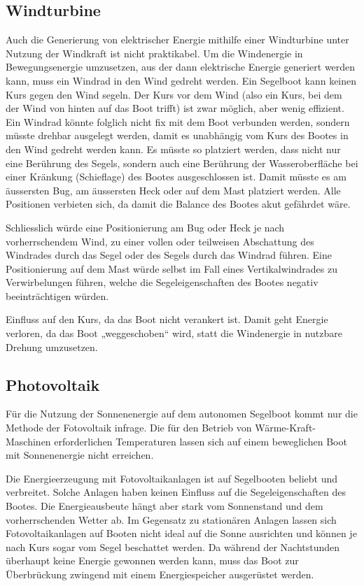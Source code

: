 \subsection{Windturbine}
Auch die Generierung von elektrischer Energie mithilfe einer Windturbine unter Nutzung der Windkraft ist nicht praktikabel. Um die Windenergie in Bewegungsenergie umzusetzen, aus der dann elektrische Energie generiert werden kann, muss ein Windrad in den Wind gedreht werden. Ein Segelboot kann keinen Kurs gegen den Wind segeln. Der Kurs vor dem Wind (also ein Kurs, bei dem der Wind von hinten auf das Boot trifft) ist zwar möglich, aber wenig effizient. Ein Windrad könnte folglich nicht fix mit dem Boot verbunden werden, sondern müsste drehbar ausgelegt werden, damit es unabhängig vom Kurs des Bootes in den Wind gedreht werden kann. Es müsste so platziert werden, dass nicht nur eine Berührung des Segels, sondern auch eine Berührung der Wasseroberfläche bei einer Kränkung (Schieflage) des Bootes ausgeschlossen ist. Damit müsste es am äussersten Bug, am äussersten Heck oder auf dem Mast platziert werden. Alle Positionen verbieten sich, da damit die Balance des Bootes akut gefährdet wäre. 

Schliesslich würde eine Positionierung am Bug oder Heck je nach vorherrschendem Wind, zu einer vollen oder teilweisen Abschattung des Windrades durch das Segel oder des Segels durch das Windrad führen. Eine Positionierung auf dem Mast würde selbst im Fall eines Vertikalwindrades zu Verwirbelungen führen, welche die Segeleigenschaften des Bootes negativ beeinträchtigen würden.

Einfluss auf den Kurs, da das Boot nicht verankert ist. Damit geht Energie verloren, da das Boot „weggeschoben“ wird, statt die Windenergie in nutzbare Drehung umzusetzen.

\subsection{Photovoltaik}
Für die Nutzung der Sonnenenergie auf dem autonomen Segelboot kommt nur die Methode der Fotovoltaik infrage. Die für den Betrieb von Wärme-Kraft-Maschinen erforderlichen Temperaturen lassen sich auf einem beweglichen Boot mit Sonnenenergie nicht erreichen.

Die Energieerzeugung mit Fotovoltaikanlagen ist auf Segelbooten beliebt und verbreitet. Solche Anlagen haben keinen Einfluss auf die Segeleigenschaften des Bootes. Die Energieausbeute hängt aber stark vom Sonnenstand und dem vorherrschenden Wetter ab. Im Gegensatz zu stationären Anlagen lassen sich Fotovoltaikanlagen auf Booten nicht ideal auf die Sonne ausrichten und können je nach Kurs sogar vom Segel beschattet werden. Da während der Nachtstunden überhaupt keine Energie gewonnen werden kann, muss das Boot zur Überbrückung zwingend mit einem Energiespeicher ausgerüstet werden.

